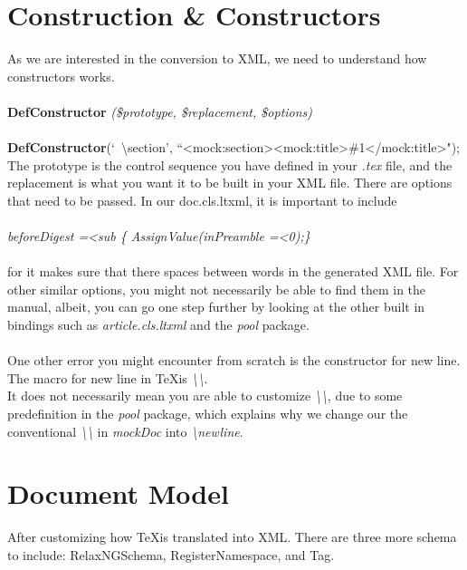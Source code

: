 \documentclass{book}
\begin{document}
\section{Construction \& Constructors}
As we are interested in the conversion to XML, we need to understand how constructors works. \\ \\
\textbf{DefConstructor} \emph{ (\$prototype, \$replacement, \$options) } \\ \\
\textbf{DefConstructor}(`\ \textbackslash section{}', ``\textless mock:section\textgreater\textless mock:title\textgreater \#1\textless/mock:title\textgreater");
The prototype is the control sequence you have defined in your \emph{.tex} file, and the replacement is what you want it to be built in your XML file. There 
are options that need to be passed. In our doc.cls.ltxml, it is important to include \\ \\
 \emph {beforeDigest =\textless sub \{ AssignValue(inPreamble =\textless 0);\}} \\ \\
 for it makes sure that there spaces between words in the generated XML file. For other similar options, you might not necessarily be able to find them in 
 the manual, albeit, you can go one step further by looking at the other built in bindings such as \emph {article.cls.ltxml} and the \emph {pool} package. \\ \\
 One other error you might encounter from scratch is the constructor for new line. The macro for new line in \TeX is  \emph{\textbackslash\textbackslash}. \\
 It does not necessarily mean you are able to customize  \emph{\textbackslash\textbackslash}, due to some predefinition in the \emph {pool} package, which explains 
 why we change our the conventional  \emph{\textbackslash\textbackslash} in \emph{mockDoc} into \emph{ \textbackslash newline}.

\section{Document Model}
After customizing how \TeX  is translated into XML. There are three more schema to include: RelaxNGSchema, RegisterNamespace, and Tag.
\end{document}
